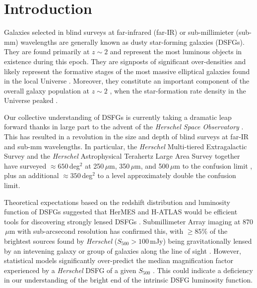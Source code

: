 \documentclass[iop]{emulateapj}
\begin{document}



\section{Introduction} \label{sec:intro} 

Galaxies selected in blind surveys at far-infrared (far-IR) or sub-millimieter
(sub-mm) wavelengths are generally known as dusty star-forming galaxies
(DSFGs).  They are found primarily at $z \sim2$ \citep{2005ApJ...622..772C} and
represent the most luminous objects in existence during this epoch.   They are
signposts of significant over-densities and likely represent the formative
stages of the most massive elliptical galaxies found in the local Universe
\citep[e.g.,][]{Ivison:2013fk, Fu:2013lr}.  Moreover, they constitute an
important component of the overall galaxy population at $z \sim 2$
\citep[e.g.,][]{2005ApJ...632..169L}, when the star-formation rate density in
the Universe peaked \citep[e.g.,][]{1996MNRAS.283.1388M}.  

Our collective understanding of DSFGs is currently taking a dramatic leap
forward thanks in large part to the advent of the {\it Herschel Space
Observatory} \citep[{\it Herschel};][]{Pilbratt:2010fk}.  This has resulted in a
revolution in the size and depth of blind surveys at far-IR and sub-mm
wavelengths.  In particular, the {\it Herschel} Multi-tiered Extragalactic
Survey \citep[HerMES;][]{Oliver:2012lr} and the {\it Herschel} Astrophysical
Terahertz Large Area Survey \citep[H-ATLAS;][]{2010PASP..122..499E} together
have surveyed $\approx 650\,$deg$^2$ at 250$\,\mu$m, 350$\,\mu$m, and
500$\,\mu$m to the confusion limit \citep[$\sigma \approx 6-7\,$mJy in each
band][]{Nguyen:2010fk}, plus an additional $\approx 350\,$deg$^2$ to a level
approximately double the confusion limit.

Theoretical expectations based on the redshift distribution and luminosity
function of DSFGs suggested that HerMES and H-ATLAS would be efficient tools
for discovering strongly lensed DSFGs \citep[e.g.,][]{1996MNRAS.283.1340B,
2007MNRAS.377.1557N}.  Submillimeter Array \citep[SMA;][]{Ho:2004lr} imaging at
870$\,\mu$m with sub-arcsecond resolution has confirmed this, with $\geq 85\%$
of the brightest sources found by {\it Herschel} ($S_{500} > 100\,$mJy) being
gravitationally lensed by an intevening galaxy or group of galaxies along the
line of sight \citep{Negrello:2010fk, Wardlow:2013lr, Bussmann:2013lr}.
However, statistical models significantly over-predict the median magnification
factor experienced by a {\it Herschel} DSFG of a given $S_{500}$
\citep{Bussmann:2013lr}.  This could indicate a deficiency in our understanding
of the bright end of the intrinsic DSFG luminosity function.
\end{document}
